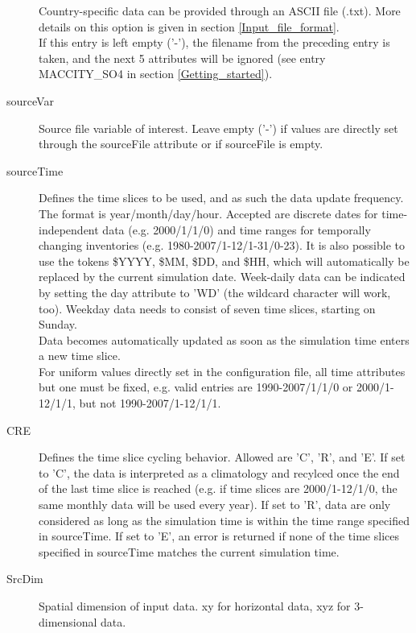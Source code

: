 \documentclass[12pt,a4paper]{article} %
\begin{document}
\begin{description}
Country-specific data can be provided through an ASCII file (\*.txt). More details on this option is given in section \ref{Input_file_format}.\\
If this entry is left empty ('-'), the filename from the preceding entry is taken, and the next 5 attributes will be ignored (see entry MACCITY\_SO4 in section \ref{Getting_started}).
\item [sourceVar] Source file variable of interest. Leave empty ('-') if values are directly set through the sourceFile attribute or if sourceFile is empty.
\item [sourceTime] Defines the time slices to be used, and as such the data update frequency. The format is year/month/day/hour. Accepted are discrete dates for time-independent data (e.g. 2000/1/1/0) and time ranges for temporally changing inventories (e.g. 1980-2007/1-12/1-31/0-23). It is also possible to use the tokens \$YYYY, \$MM, \$DD, and \$HH, which will automatically be replaced by the current simulation date. Week-daily data can be indicated by setting the day attribute to 'WD' (the wildcard character will work, too). Weekday data needs to consist of seven time slices, starting on Sunday.\\
Data becomes automatically updated as soon as the simulation time enters a new time slice.\\
For uniform values directly set in the configuration file, all time attributes but one must be fixed, e.g. valid entries are 1990-2007/1/1/0 or 2000/1-12/1/1, but not 1990-2007/1-12/1/1.\\
\item [CRE] Defines the time slice cycling behavior. Allowed are 'C', 'R', and 'E'. If set to 'C', the data is interpreted as a climatology and recylced once the end of the last time slice is reached (e.g. if time slices are 2000/1-12/1/0, the same monthly data will be used every year). If set to 'R', data are only considered as long as the simulation time is within the time range specified in sourceTime. If set to 'E', an error is returned if none of the time slices specified in sourceTime matches the current simulation time.
\item [SrcDim] Spatial dimension of input data. xy for horizontal data, xyz for 3-dimensional data.

\end{description}
\end{document}
